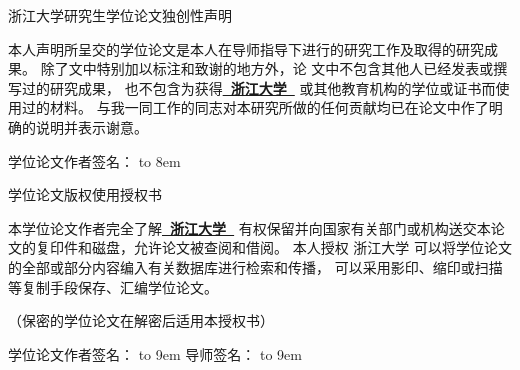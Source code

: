 \vspace*{-2mm}

{\songti
{}

\begin{center}
{\noindent\songti{}浙江大学研究生学位论文独创性声明}\\
\end{center}

{
\setlength{\baselineskip}{1.3\baselineskip}
本人声明所呈交的学位论文是本人在导师指导下进行的研究工作及取得的研究成果。
除了文中特别加以标注和致谢的地方外，论
文中不包含其他人已经发表或撰写过的研究成果，
也不包含为获得{\bfseries\kaishu{}\underline{~浙江大学~}}
或其他教育机构的学位或证书而使用过的材料。
与我一同工作的同志对本研究所做的任何贡献均已在论文中作了明确的说明并表示谢意。

\vspace{10ex}

{\songti{}学位论文作者签名：
{\hbox to 8em{}}%
\PutsigndateA
}

\vspace{12ex}

\begin{center}
  {\noindent\songti{}学位论文版权使用授权书}
\end{center}

本学位论文作者完全了解{\bfseries\kaishu{}\underline{~浙江大学~}}
有权保留并向国家有关部门或机构送交本论文的复印件和磁盘，允许论文被查阅和借阅。
本人授权 浙江大学 可以将学位论文的全部或部分内容编入有关数据库进行检索和传播，
可以采用影印、缩印或扫描等复制手段保存、汇编学位论文。

（保密的学位论文在解密后适用本授权书）

\vspace{2ex}

学位论文作者签名：
{\hbox to 9em{}}%
导师签名：
{\hbox to 9em{}}%

\vspace{2ex}

\PutsigndateB
\hspace{3em}
\PutsigndateC
}
}
